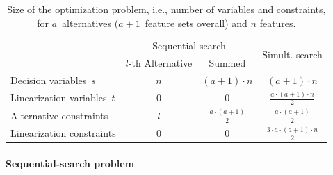 \documentclass{article}
\theoremstyle{definition}
\begin{document}
\begin{table}[t]
	\centering
	\caption{Size of the optimization problem, i.e., number of variables and constraints, for $a$~alternatives ($a + 1$~feature sets overall) and $n$ features.}
	\renewcommand*{\arraystretch}{1.3}
	\begin{tabular}{lccc}
		\toprule
		& \multicolumn{2}{c}{Sequential search} & \multirow{2}{*}{Simult. search} \\
		\cmidrule(lr){2-3}
		& $l$-th Alternative & Summed & \\
		\midrule
		Decision variables~$s$ & $n$ & $ (a+1) \cdot n$ & $(a+1) \cdot n$ \\
		Linearization variables~$t$ & $0$ & $0$ & $\frac{a \cdot (a+1) \cdot n}{2}$ \\
		Alternative constraints & $l$ & $\frac{a \cdot (a+1)}{2}$ & $\frac{a \cdot (a+1)}{2}$ \\
		Linearization constraints & $0$ & $0$ & $\frac{3 \cdot a \cdot (a+1) \cdot n}{2}$ \\
		\bottomrule
	\end{tabular}
	\label{tab:afs:seq-sim-comparison}
\end{table}

\paragraph{Sequential-search problem}
\end{document}
